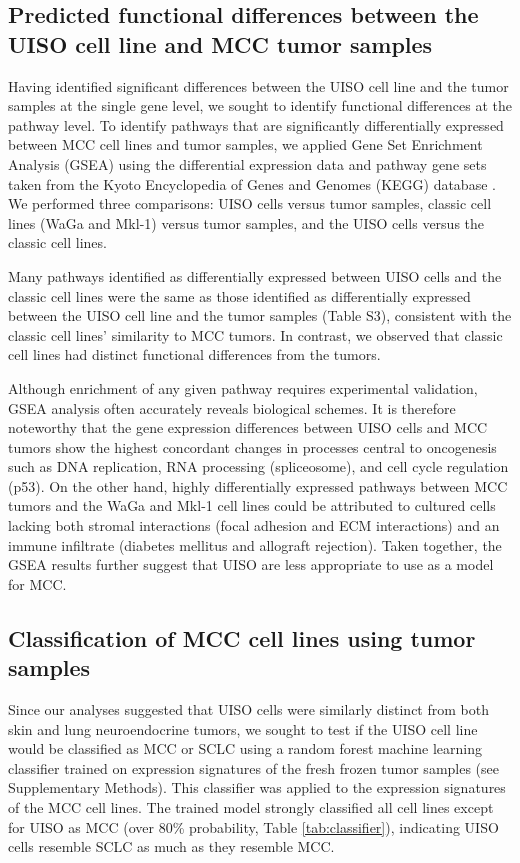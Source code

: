 \documentclass[10pt]{article}
\begin{document}
\subsection*{Predicted functional differences between the UISO cell line and MCC tumor samples}
Having identified significant differences between the UISO cell line and the tumor samples at the single gene level, we sought to identify functional differences at the pathway level.
To identify pathways that are significantly differentially expressed between MCC cell lines and tumor samples, we applied Gene Set Enrichment Analysis (GSEA) \citep{Subramanian2005Gene} using the differential expression data and pathway gene sets taken from the Kyoto Encyclopedia of Genes and Genomes (KEGG) database \citep{Kanehisa2000KEGG}.
We performed three comparisons: UISO cells versus tumor samples, classic cell lines (WaGa and Mkl-1) versus tumor samples, and the UISO cells versus the classic cell lines.

Many pathways identified as differentially expressed between UISO cells and the classic cell lines were the same as those identified as differentially expressed between the UISO cell line and the tumor samples (Table S3), consistent with the classic cell lines' similarity to MCC tumors.
In contrast, we observed that classic cell lines had distinct functional differences from the tumors.

Although enrichment of any given pathway requires experimental validation, GSEA analysis often accurately reveals biological schemes.
It is therefore noteworthy that the gene expression differences between UISO cells and MCC tumors show the highest concordant changes in processes central to oncogenesis such as DNA replication, RNA processing (spliceosome), and cell cycle regulation (p53).
On the other hand, highly differentially expressed pathways between MCC tumors and the WaGa and Mkl-1 cell lines could be attributed to cultured cells lacking both stromal interactions (focal adhesion and ECM interactions) and an immune infiltrate (diabetes mellitus and allograft rejection).
Taken together, the GSEA results further suggest that UISO are less appropriate to use as a model for MCC.

\subsection*{Classification of MCC cell lines using tumor samples}
Since our analyses suggested that UISO cells were similarly distinct from both skin and lung neuroendocrine tumors, we sought to test if the UISO cell line would be classified as MCC or SCLC using a random forest machine learning classifier trained on expression signatures of the fresh frozen tumor samples (see Supplementary Methods).
This classifier was applied to the expression signatures of the MCC cell lines.
The trained model strongly classified all cell lines except for UISO as MCC (over 80\% probability, Table \ref{tab:classifier}), indicating UISO cells resemble SCLC as much as they resemble MCC.
\end{document}
